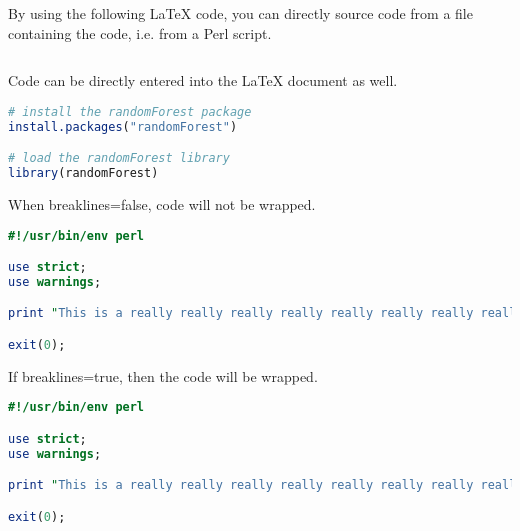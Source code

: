 \documentclass[a4paper, 12pt]{article}
\begin{document}
By using the following LaTeX code, you can directly source code from a file containing the code, i.e. from a Perl script.

\begin{lstlisting}[language=TeX,caption=Showing code from a file]

\end{lstlisting}



\noindent
Code can be directly entered into the LaTeX document as well.

\begin{lstlisting}[language=R,caption=Installing the R randomForest package]
# install the randomForest package
install.packages("randomForest")

# load the randomForest library
library(randomForest)
\end{lstlisting}

\noindent
When breaklines=false, code will not be wrapped.

\begin{lstlisting}[language=Perl,caption=Code without wrapping]
#!/usr/bin/env perl

use strict;
use warnings;

print "This is a really really really really really really really really really really really really pointless sentence!\n";

exit(0);
\end{lstlisting}

\noindent
If breaklines=true, then the code will be wrapped.

\begin{lstlisting}[language=Perl,caption=Code with wrapping,breaklines=true]
#!/usr/bin/env perl

use strict;
use warnings;

print "This is a really really really really really really really really really really really really pointless sentence!\n";

exit(0);
\end{lstlisting}
\end{document}
